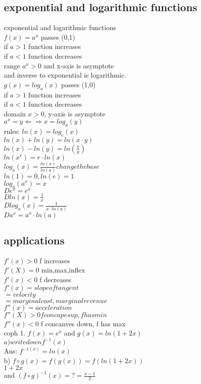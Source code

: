 \documentclass{article}
\begin{document}
  \subsection{exponential and logarithmic functions}
  exponential and logarithmic functions\\
  $f(x)=a^x$ passes (0,1)\\
  if $a>1$ function increases\\
  if $a<1$ function decreases\\
  range $a^x>0$ and x-axis is asymptote\\
  and inverse to exponential is logarithmic.\\
  $g(x)=log_a(x)$ passes (1,0)\\
  if $a>1$ function increases\\
  if $a<1$ function decreases\\
  domain $x>0$, y-axis is asymptote\\
  $a^x=y \Leftarrow\Rightarrow x=log_a(y)$\\
  rules: $ln(x)=log_e(x)$\\
  $ln(x)+ln(y)=ln(x\cdot y)$\\
  $ln(x)-ln(y)=ln(\frac{x}{y})$\\
  $ln(x^r)=r\cdot ln(x)$\\
  $log_a(x)=\frac{ln(x)}{ln(a)} change the base$\\
  $ln(1)=0, ln(e)=1$\\
  $log_a(a^x)=x$\\
  $D e^x=e^x$\\
  $D ln(x)=\frac{1}{x}$\\
  $D log_a(x)=\frac{1}{x\cdot ln(a)}$\\
  $D a^x=a^x\cdot ln(a)$
  \subsection{applications}
  $f'(x)>0$ f increases\\
  $f'(X)=0$ min,max,inflex\\
  $f'(x)<0 $ f decreases\\
  $f'(x)= slope of tangent$\\
  $=velocity$\\
  $=marginal cost, marginal revenue$\\
  $f''(x)=acceleration$\\
  $f''(X)>0 f concapes up, f has min$\\
  $f''(x)<0$ f concanves down, f has max\\
  coph 1. $f(x)=e^x$ and $g(x)=ln(1+2x)$\\
  $a) write down f^{-1}(x)$\\
  Ans: $f^{-1(x)}=ln(x)$\\
  b) $f\circ g(x)=f (g(x))=f(ln(1+2x))$\\
  $1+2x$\\
  and $(f \circ g)^{-1}(x)=?=\frac{x-1}{2}$\\


   
\end{document}
